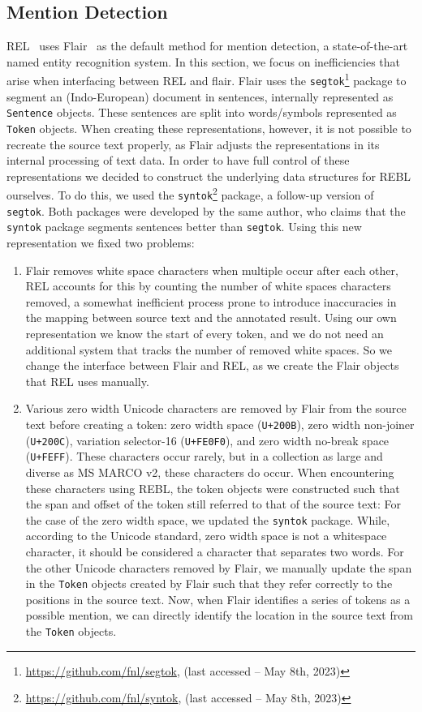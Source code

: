 \subsection{Mention Detection}
REL~\citep{rel} uses Flair~\citep{flair} as the default method for mention detection, a state-of-the-art named entity recognition system.
In this section, we focus on inefficiencies that arise when interfacing between REL and flair. 
Flair uses the \texttt{segtok}\footnote{\url{https://github.com/fnl/segtok}, (last accessed -- May 8th, 2023)} package to segment an (Indo-European) document in sentences, internally represented as \texttt{Sentence} objects. These sentences are split into words/symbols represented as \texttt{Token} objects.
When creating these representations, however, it is not possible to recreate the source text properly, as 
Flair adjusts the representations in its internal processing of text data. In order to have full control of these representations we decided to  construct the underlying data structures for REBL ourselves. To do this, we used the \texttt{syntok}\footnote{\url{https://github.com/fnl/syntok}, (last accessed -- May 8th, 2023)} package, a follow-up version of \texttt{segtok}.
Both packages were developed by the same author, who claims that the \texttt{syntok} package segments sentences better than \texttt{segtok}. 
Using this new representation we fixed two problems: 
\begin{enumerate}
	\item Flair removes white space characters when multiple occur after each other, REL accounts for this by counting the number of white spaces characters removed, a somewhat inefficient process prone to introduce inaccuracies in the mapping between source text and the annotated result. Using our own representation we know the start of every token, and we do not need an additional system that tracks the number of removed white spaces. So we change the interface between Flair and REL, as we create the Flair objects that REL uses manually. 
	\item Various zero width Unicode characters are removed by Flair from the source text before creating a token: zero width space (\texttt{U+200B}), zero width non-joiner (\texttt{U+200C}), variation selector-16 (\texttt{U+FE0F0}), and zero width no-break space (\texttt{U+FEFF}). 
	These characters occur rarely, but in a collection as large and diverse as MS MARCO v2, these characters do occur. When encountering these characters using REBL, the token objects were constructed such that the span and offset of the token still referred to that of the source text:
	For the case of the zero width space, we updated the \texttt{syntok} package. While, according to the Unicode standard, zero width space is not a whitespace character, it should be considered a character that separates two words. For the other Unicode characters removed by Flair, we manually update the span in the \texttt{Token} objects created by Flair such that they refer correctly to the positions in the source text. Now, when Flair identifies a series of tokens as a possible mention, we can directly identify the location in the source text from the \texttt{Token} objects.
\end{enumerate}


